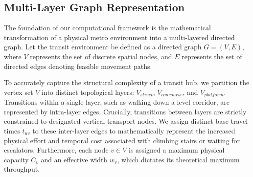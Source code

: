 \documentclass[conference]{IEEEtran}
\begin{document}
\subsection{Multi-Layer Graph Representation}
The foundation of our computational framework is the mathematical transformation of a physical metro environment into a multi-layered directed graph. Let the transit environment be defined as a directed graph $G = (V, E)$, where $V$ represents the set of discrete spatial nodes, and $E$ represents the set of directed edges denoting feasible movement paths. 

To accurately capture the structural complexity of a transit hub, we partition the vertex set $V$ into distinct topological layers: $V_{street}$, $V_{concourse}$, and $V_{platform}$. Transitions within a single layer, such as walking down a level corridor, are represented by intra-layer edges. Crucially, transitions between layers are strictly constrained to designated vertical transport nodes. We assign distinct base travel times $t_{uv}$ to these inter-layer edges to mathematically represent the increased physical effort and temporal cost associated with climbing stairs or waiting for escalators. Furthermore, each node $v \in V$ is assigned a maximum physical capacity $C_v$ and an effective width $w_v$, which dictates its theoretical maximum throughput.
\end{document}
